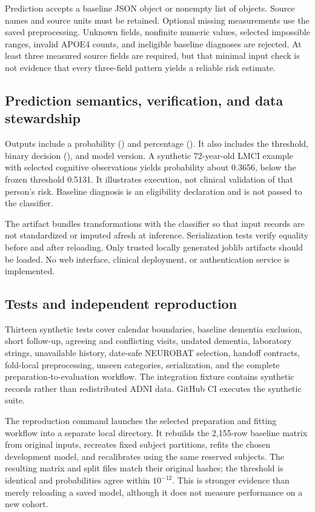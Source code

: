 \documentclass[11pt,a4paper]{article}
\newcommand{\code}[1]{\texttt{\detokenize{#1}}}
\begin{document}
Prediction accepts a baseline JSON object or nonempty list of objects. Source names and source units must be retained. Optional missing measurements use the saved preprocessing. Unknown fields, nonfinite numeric values, selected impossible ranges, invalid APOE4 counts, and ineligible baseline diagnoses are rejected. At least three measured source fields are required, but that minimal input check is not evidence that every three-field pattern yields a reliable risk estimate.

\clearpage
\subsection{Prediction semantics, verification, and data stewardship}
Outputs include a probability () and percentage (\code{risk_percent}). It also includes the threshold, binary decision (), and model version. A synthetic 72-year-old LMCI example with selected cognitive observations yields probability about 0.3656, below the frozen threshold 0.5131. It illustrates execution, not clinical validation of that person's risk. Baseline diagnosis is an eligibility declaration and is not passed to the classifier.

The artifact bundles transformations with the classifier so that input records are not standardized or imputed afresh at inference. Serialization tests verify equality before and after reloading. Only trusted locally generated joblib artifacts should be loaded. No web interface, clinical deployment, or authentication service is implemented.
\subsection{Tests and independent reproduction}
Thirteen synthetic tests cover calendar boundaries, baseline dementia exclusion, short follow-up, agreeing and conflicting visits, undated dementia, laboratory strings, unavailable history, date-safe NEUROBAT selection, handoff contracts, fold-local preprocessing, unseen categories, serialization, and the complete preparation-to-evaluation workflow. The integration fixture contains synthetic records rather than redistributed ADNI data. GitHub CI executes the synthetic suite.

The reproduction command launches the selected preparation and fitting workflow into a separate local directory. It rebuilds the 2,155-row baseline matrix from original inputs, recreates fixed subject partitions, refits the chosen development model, and recalibrates using the same reserved subjects. The resulting matrix and split files match their original hashes; the threshold is identical and probabilities agree within $10^{-12}$. This is stronger evidence than merely reloading a saved model, although it does not measure performance on a new cohort.
\end{document}
